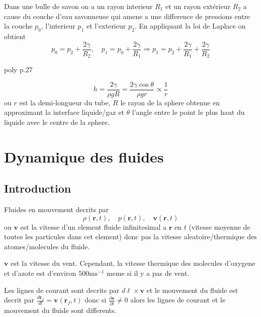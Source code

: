 \begin{example} 
Dans une bulle de savon on a un rayon interieur $R_{1}$ et un rayon extérieur $R_{2}$ a cause du couche d'eau savonneuse qui amene a une difference de pressions entre la couche $p_{0}$, l'interieur $p_{1}$ et l'exterieur $p_{2}$. En appliquant la loi de Laplace on obtient 
$$
p_{0}=p_{2}+\frac{2\gamma}{R_{2}},\quad p_{1}=p_{0}+\frac{2\gamma}{R_{1}}\Rightarrow p_{1}=p_{2}+\frac{2\gamma}{R_{1}}+\frac{2\gamma}{R_{2}}
$$
\end{example}
\begin{example}[Capillarite]
poly p.27
\end{example}

\begin{theorem}
$$
h=\frac{2\gamma}{\rho gR}=\frac{2\gamma \cos \theta}{\rho gr}\propto \frac{1}{r}
$$
ou $r$ est la demi-longueur du tube, $R$ le rayon de la sphere obtenue en approximant la interface liquide/gaz et $\theta$ l'angle entre le point le plus haut du liquide avec le centre de la sphere.
\end{theorem}

\chapter{Dynamique des fluides}

\section{Introduction}

Fluides en mouvement decrits par 
$$
\rho(\boldsymbol{r},t),\quad p(\boldsymbol{r},t),\quad \boldsymbol{v}(\boldsymbol{r},t)
$$
ou $\boldsymbol{v}$ est la vitesse d'un element fluide infinitesimal a $\boldsymbol{r}$ en $t$ (vitesse moyenne de toutes les particules dans cet element) donc pas la vitesse aleatoire/thermique des atomes/molecules du fluide.
\begin{example}[Atmosphere]
$\boldsymbol{v}$ est la vitesse du vent. Cependant, la vitesse thermique des molecules d'oxygene et d'azote est d'environ $500\mathrm{m}\mathrm{s}^{-1}$ meme si il y a pas de vent. 
\begin{remark}
Les lignes de courant sont decrits par $d\boldsymbol{\ell}\times \boldsymbol{v}$ et le mouvement du fluide est decrit par $\frac{d\boldsymbol{r}_{f}}{dt}=\boldsymbol{v}(\boldsymbol{r}_{f},t)$ donc si $\frac{ \partial \boldsymbol{v} }{ \partial t }\neq 0$ alors les lignes de courant et le mouvement du fluide sont differents.
\end{remark}
\end{example}

